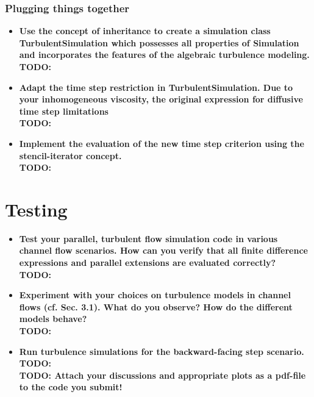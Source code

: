 \documentclass[a4paper]{article}
\newcommand{\td}[1]{
	\textbf{\color{red}TODO: {#1}}
}
\begin{document}
\subsubsection{Plugging things together}
\begin{itemize}
	\item \textbf{Use the concept of inheritance to create a simulation class TurbulentSimulation which possesses all properties of Simulation and incorporates the features of the algebraic turbulence modeling.}\\
	\td{}
	\item \textbf{Adapt the time step restriction in TurbulentSimulation. Due to your inhomogeneous viscosity, the original expression for diffusive time step limitations}\\
	\td{}
	\item \textbf{Implement the evaluation of the new time step criterion using the stencil-iterator concept.}\\
	\td{}
	
	
\end{itemize}





\section{Testing}
\begin{itemize}
	\item \textbf{Test your parallel, turbulent flow simulation code in various channel flow scenarios. How can you verify that all finite difference expressions and parallel extensions are evaluated correctly?}\\
	\td{}
	\item \textbf{Experiment with your choices on turbulence models in channel flows (cf. Sec. 3.1). What do you observe? How do the different models behave?}\\
	\td{}
	\item\textbf{Run turbulence simulations for the backward-facing step scenario.}\\
	\td{}\\
	\td{Attach your discussions and appropriate plots as a pdf-file to the code you submit!}
\end{itemize}
\end{document}
